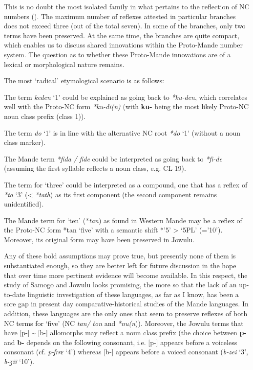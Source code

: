 This is no doubt the most isolated family in what pertains to the reflection of NC numbers (). The maximum number of reflexes attested in particular branches does not exceed three (out of the total seven). In some of the branches, only two terms have been preserved. At the same time, the branches are quite compact, which enables us to discuss shared innovations within the Proto-Mande number system. The question as to whether these Proto-Mande innovations are of a lexical or morphological nature remains.

The most ‘radical’ etymological scenario is as follows:

The term \textit{keden} ‘1’ could be explained as going back to \textit{*ku-den}, which correlates well with the Proto-NC form \textit{*ku-di(n)} (with \textbf{ku-} being the most likely Proto-NC noun class prefix (class 1)). 

The term \textit{do} ‘1’ is in line with the alternative NC root \textit{*do} ‘1’ (without a noun class marker).

The Mande term \textit{*fida} \textit{/} \textit{fide} could be interpreted as going back to \textit{*fi}\textit{-}\textit{de} (assuming the first syllable reflects a noun class, e.g. CL 19).

The term for ‘three’ could be interpreted as a compound, one that has a reflex of \textit{*ta} ‘3’ (< \textit{*tath}) as its first component (the second component remains unidentified).  

The Mande term for ‘ten’ (*\textit{tan}) as found in Western Mande may be a reflex of the Proto-NC form *tan ‘five’ with a semantic shift *’5’ > ‘5PL’ (=’10’). Moreover, its original form may have been preserved in Jowulu. 

Any of these bold assumptions may prove true, but presently none of them is substantiated enough, so they are better left for future discussion in the hope that over time more pertinent evidence will become available. In this respect, the study of Samogo and Jowulu looks promising, the more so that the lack of an up-to-date linguistic investigation of these languages, as far as I know, has been a sore gap in present day comparative-historical studies of the Mande languages. In addition, these languages are the only ones that seem to preserve reflexes of both NC terms for ‘five’ (NC \textit{tan/} \textit{ton} and \textit{*nu}\textit{(n})). Moreover, the Jowulu terms that have [p-] {\textasciitilde} [b-] allomorphs may reflect a noun class prefix (the choice between \textbf{p-} and \textbf{b-} depends on the following consonant, i.e. [p-] appears before a voiceless consonant (cf. \textit{p-ʃɪrɛ} ‘4’) whereas [b-] appears before a voiced consonant (\textit{b-zei} ‘3’, \textit{b-ʒ{\~{i}}{\~{i}}} ‘10’).

